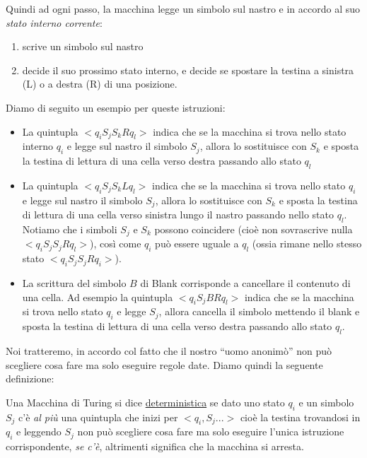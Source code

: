 Quindi ad ogni passo, la macchina legge un simbolo sul nastro e in accordo al
suo \textsl{stato interno corrente}:

\begin{enumerate}
\item scrive un simbolo sul nastro
\item decide il suo prossimo stato interno, e decide se spostare la testina a
sinistra (L) o a destra (R) di una posizione.
\end{enumerate}
\vspace{0.5cm}

Diamo di seguito un esempio per queste istruzioni:

\begin{itemize}
\item La quintupla $<q_{i}S_{j}S_{k}Rq_{l}>$ indica che se la macchina
  si trova nello stato interno $q_{i}$ e legge sul nastro il simbolo
  $S_{j}$, allora lo sostituisce con $S_{k}$ e sposta la testina di
  lettura di una cella verso destra passando allo stato $q_{l}$
\item La quintupla $<q_{i}S_{j}S_{k}Lq_{l}>$ indica che se la macchina
  si trova nello stato $q_{i}$ e legge sul nastro il simbolo $S_{j}$,
  allora lo sostituisce con $S_{k}$ e sposta la testina di lettura di
  una cella verso sinistra lungo il nastro passando nello stato
  $q_{l}$.\\ Notiamo che i simboli $S_{j}$ e $S_{k}$ possono
  coincidere (cio\`e non sovrascrive nulla $<q_{i}S_{j}S_{j}Rq_{l}>$),
  cos\`i come $q_{i}$ pu\`o essere uguale a $q_{l}$ (ossia rimane
  nello stesso stato $<q_{i}S_{j}S_{j}Rq_{i}>$).
\item La scrittura del simbolo $B$ di Blank corrisponde a cancellare
  il contenuto di una cella. Ad esempio la quintupla
  $<q_{i}S_{j}BRq_{l}>$ indica che se la macchina si trova nello stato
  $q_{i}$ e legge $S_{j}$, allora cancella il simbolo mettendo il
  blank e sposta la testina di lettura di una cella verso destra
  passando allo stato $q_{l}$.
\end{itemize}

Noi tratteremo, in accordo col fatto che il nostro ``uomo anonim\`o''
non pu\`o scegliere cosa fare ma solo eseguire regole date. Diamo
quindi la seguente definizione:

\begin{defi}
Una Macchina di Turing si dice \underline{deterministica} se dato uno
stato $q_{i}$ e un simbolo $S_{j}$ c'\`e \textsl{al pi\`u} una
quintupla che inizi per $<q_{i},S_{j}...>$ cio\`e la testina
trovandosi in $q_{i}$ e leggendo $S_{j}$ non pu\`o scegliere cosa fare
ma solo eseguire l'unica istruzione corrispondente, \textsl{se c'\`e},
altrimenti significa che la macchina si arresta.
\end{defi}

